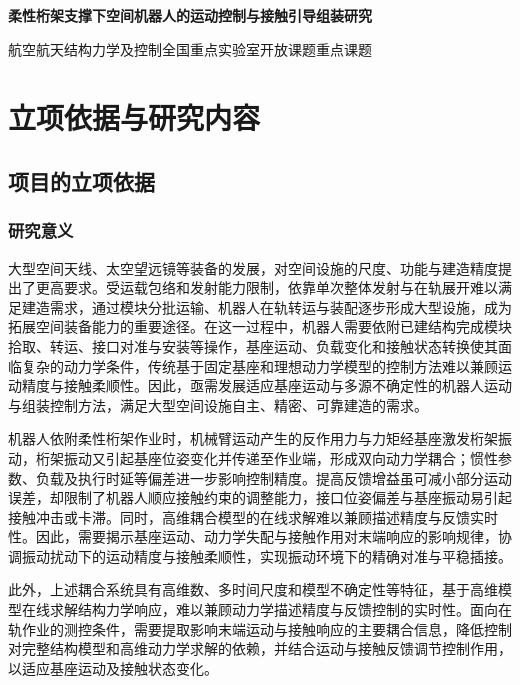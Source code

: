 \documentclass[UTF8,a4paper,zihao=-4,fontset=fandol]{ctexart}
\begin{document}
\begin{center}
 {\bfseries 柔性桁架支撑下空间机器人的运动控制与接触引导组装研究\par
\par}
 \vspace{0.55em}
 {航空航天结构力学及控制全国重点实验室开放课题\quad 重点课题}
\end{center}
\vspace{0.35em}

\section{立项依据与研究内容}

\subsection{项目的立项依据}

\subsubsection{研究意义}

大型空间天线、太空望远镜等装备的发展，对空间设施的尺度、功能与建造精度提出了更高要求。受运载包络和发射能力限制，依靠单次整体发射与在轨展开难以满足建造需求，通过模块分批运输、机器人在轨转运与装配逐步形成大型设施，成为拓展空间装备能力的重要途径\cite{hu2025,wu2024}。在这一过程中，机器人需要依附已建结构完成模块拾取、转运、接口对准与安装等操作，基座运动、负载变化和接触状态转换使其面临复杂的动力学条件，传统基于固定基座和理想动力学模型的控制方法难以兼顾运动精度与接触柔顺性。因此，亟需发展适应基座运动与多源不确定性的机器人运动与组装控制方法，满足大型空间设施自主、精密、可靠建造的需求。

机器人依附柔性桁架作业时，机械臂运动产生的反作用力与力矩经基座激发桁架振动，桁架振动又引起基座位姿变化并传递至作业端，形成双向动力学耦合；惯性参数、负载及执行时延等偏差进一步影响控制精度。提高反馈增益虽可减小部分运动误差，却限制了机器人顺应接触约束的调整能力，接口位姿偏差与基座振动易引起接触冲击或卡滞。同时，高维耦合模型的在线求解难以兼顾描述精度与反馈实时性。因此，需要揭示基座运动、动力学失配与接触作用对末端响应的影响规律，协调振动扰动下的运动精度与接触柔顺性，实现振动环境下的精确对准与平稳插接。

此外，上述耦合系统具有高维数、多时间尺度和模型不确定性等特征，基于高维模型在线求解结构力学响应，难以兼顾动力学描述精度与反馈控制的实时性。面向在轨作业的测控条件，需要提取影响末端运动与接触响应的主要耦合信息，降低控制对完整结构模型和高维动力学求解的依赖，并结合运动与接触反馈调节控制作用，以适应基座运动及接触状态变化。
\end{document}
